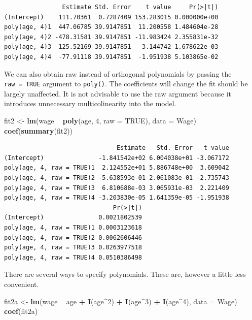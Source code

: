 \documentclass[]{article}
\newenvironment{Shaded}{\begin{snugshade}}{\end{snugshade}}
\newcommand{\DataTypeTok}[1]{\textcolor[rgb]{0.13,0.29,0.53}{#1}}
\newcommand{\DecValTok}[1]{\textcolor[rgb]{0.00,0.00,0.81}{#1}}
\newcommand{\KeywordTok}[1]{\textcolor[rgb]{0.13,0.29,0.53}{\textbf{#1}}}
\newcommand{\NormalTok}[1]{#1}
\newcommand{\OperatorTok}[1]{\textcolor[rgb]{0.81,0.36,0.00}{\textbf{#1}}}
\newcommand{\OtherTok}[1]{\textcolor[rgb]{0.56,0.35,0.01}{#1}}
\newcommand{\StringTok}[1]{\textcolor[rgb]{0.31,0.60,0.02}{#1}}
\begin{document}
\begin{verbatim}
                Estimate Std. Error    t value     Pr(>|t|)
(Intercept)    111.70361  0.7287409 153.283015 0.000000e+00
poly(age, 4)1  447.06785 39.9147851  11.200558 1.484604e-28
poly(age, 4)2 -478.31581 39.9147851 -11.983424 2.355831e-32
poly(age, 4)3  125.52169 39.9147851   3.144742 1.678622e-03
poly(age, 4)4  -77.91118 39.9147851  -1.951938 5.103865e-02
\end{verbatim}

We can also obtain raw instead of orthogonal polynomials by passing the \texttt{raw\ =\ TRUE} argument to \texttt{poly()}. The coefficients will change the fit should be largely unaffected. It is not advisable to use the raw argument because it introduces unnecessary multicolinearity into the model.

\begin{Shaded}
\begin{Highlighting}[]
\NormalTok{fit2 <-}\StringTok{ }\KeywordTok{lm}\NormalTok{(wage }\OperatorTok{~}\StringTok{ }\KeywordTok{poly}\NormalTok{(age, }\DecValTok{4}\NormalTok{, }\DataTypeTok{raw =} \OtherTok{TRUE}\NormalTok{), }\DataTypeTok{data =}\NormalTok{ Wage)}
\KeywordTok{coef}\NormalTok{(}\KeywordTok{summary}\NormalTok{(fit2))}
\end{Highlighting}
\end{Shaded}

\begin{verbatim}
                               Estimate   Std. Error   t value
(Intercept)               -1.841542e+02 6.004038e+01 -3.067172
poly(age, 4, raw = TRUE)1  2.124552e+01 5.886748e+00  3.609042
poly(age, 4, raw = TRUE)2 -5.638593e-01 2.061083e-01 -2.735743
poly(age, 4, raw = TRUE)3  6.810688e-03 3.065931e-03  2.221409
poly(age, 4, raw = TRUE)4 -3.203830e-05 1.641359e-05 -1.951938
                              Pr(>|t|)
(Intercept)               0.0021802539
poly(age, 4, raw = TRUE)1 0.0003123618
poly(age, 4, raw = TRUE)2 0.0062606446
poly(age, 4, raw = TRUE)3 0.0263977518
poly(age, 4, raw = TRUE)4 0.0510386498
\end{verbatim}

There are several ways to specify polynomials. These are, however a little less convenient.

\begin{Shaded}
\begin{Highlighting}[]
\NormalTok{fit2a <-}\StringTok{ }\KeywordTok{lm}\NormalTok{(wage }\OperatorTok{~}\StringTok{ }\NormalTok{age }\OperatorTok{+}\StringTok{ }\KeywordTok{I}\NormalTok{(age}\OperatorTok{^}\DecValTok{2}\NormalTok{) }\OperatorTok{+}\StringTok{ }\KeywordTok{I}\NormalTok{(age}\OperatorTok{^}\DecValTok{3}\NormalTok{) }\OperatorTok{+}\StringTok{ }\KeywordTok{I}\NormalTok{(age}\OperatorTok{^}\DecValTok{4}\NormalTok{), }\DataTypeTok{data =}\NormalTok{ Wage)}
\KeywordTok{coef}\NormalTok{(fit2a)}
\end{Highlighting}
\end{Shaded}
\end{document}
